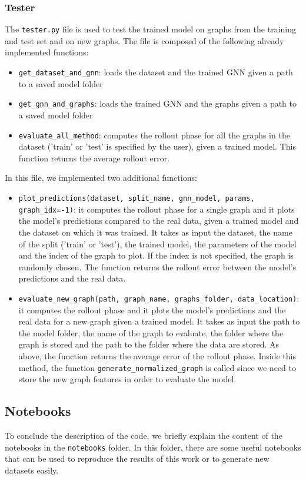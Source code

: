\documentclass[11pt,a4paper]{article}
\begin{document}
\subsubsection*{Tester}
The \texttt{tester.py} file is used to test the trained model on graphs from the training and test set and on new graphs. The file is composed of the following already implemented functions: 
\begin{itemize}
    \item \texttt{get\_dataset\_and\_gnn}: loads the dataset and the trained GNN given a path to a saved model folder
    \item \texttt{get\_gnn\_and\_graphs}: loads the trained GNN and the graphs given a path to a saved model folder
    \item \texttt{evaluate\_all\_method}: computes the rollout phase for all the graphs in the dataset ('train' or 'test' is specified by the user), given a trained model. This function returns the average rollout error. 
\end{itemize}

In this file, we implemented two additional functions:
\begin{itemize}
    \item \texttt{plot\_predictions(dataset, split\_name, gnn\_model, params, graph\_idx=-1)}: it computes the rollout phase for a single graph and it plots the model's predictions compared to the real data, given a trained model and the dataset on which it was trained.
    It takes as input the dataset, the name of the split ('train' or 'test'), the trained model, the parameters of the model and the index of the graph to plot. If the index is not specified, the graph is randomly chosen. The function returns the rollout error between the model's predictions and the real data.
    \item \texttt{evaluate\_new\_graph(path, graph\_name, graphs\_folder, data\_location)}: it computes the rollout phase and it plots the model's predictions and the real data for a new graph given a trained model. It takes as input the path to the model folder, the name of the graph to evaluate, the folder where the graph is stored and the path to the folder where the data are stored. As above, the function returns the average error of the rollout phase. Inside this method, the function \texttt{generate\_normalized\_graph} is called since we need to store the new graph features in order to evaluate the model.
\end{itemize}

\subsection{Notebooks}
To conclude the description of the code, we briefly explain the content of the notebooks in the \texttt{notebooks} folder. In this folder, there are some useful notebooks that can be used to reproduce the results of this work or to generate new datasets easily.
\end{document}
